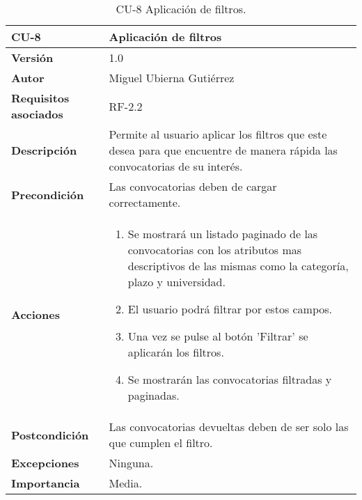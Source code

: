 \begin{table}[p]
	\centering
	\begin{tabularx}{\linewidth}{ p{} p{} }
		\toprule
		\textbf{CU-8}    & \textbf{Aplicación de filtros}\\
		\toprule
		\textbf{Versión}              & 1.0    \\
		\textbf{Autor}                & Miguel Ubierna Gutiérrez \\
		\textbf{Requisitos asociados} & RF-2.2 \\
		\textbf{Descripción}          & Permite al usuario aplicar los filtros que este desea para que encuentre de manera rápida las convocatorias de su interés.  \\
		\textbf{Precondición}         & Las convocatorias deben de cargar correctamente.\\
		\textbf{Acciones}             &
		\begin{enumerate}
			\def\labelenumi{\arabic{enumi}.}
			\tightlist
			\item Se mostrará un listado paginado de las convocatorias con los atributos mas descriptivos de las mismas como la categoría, plazo y universidad.
                \item El usuario podrá filtrar por estos campos.
                \item Una vez se pulse al botón 'Filtrar' se aplicarán los filtros.
                \item Se mostrarán las convocatorias filtradas y paginadas.
		\end{enumerate}\\
		\textbf{Postcondición}        & Las convocatorias devueltas deben de ser solo las que cumplen el filtro. \\
		\textbf{Excepciones}          & Ninguna.  \\
		\textbf{Importancia}          & Media.  \\
		\bottomrule
	\end{tabularx}
	\caption{CU-8 Aplicación de filtros.}
\end{table}


